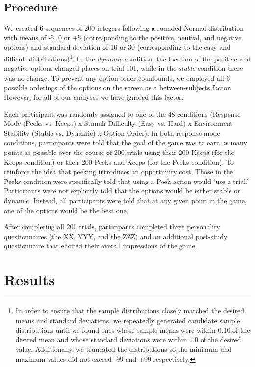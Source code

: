 \documentclass[a4paper,doc,natbib,floatsintext]{apa6}
\begin{document}
\subsection{Procedure}

We created 6 sequences of 200 integers following a rounded Normal distribution with means of -5, 0 or +5 (corresponding to the positive, neutral, and negative options) and standard deviation of 10 or 30 (corresponding to the easy and difficult distributions)\footnote{In order to ensure that the sample distributions closely matched the desired means and standard deviations, we repeatedly generated candidate sample distributions until we found ones whose sample means were within 0.10 of the desired mean and whose standard deviations were within 1.0 of the desired value. Additionally, we truncated the distributions so the minimum and maximum values did not exceed -99 and +99 respectively.}. In the \textit{dynamic} condition, the location of the positive and negative options changed places on trial 101, while in the \textit{stable} condition there was no change. To prevent any option order counfounds, we employed all 6 possible orderings of the options on the screen as a between-subjects factor. However, for all of our analyses we have ignored this factor.

Each participant was randomly assigned to one of the 48 conditions (Response Mode (Peeks vs. Keeps) x Stimuli Difficulty (Easy vs. Hard) x Environment Stability (Stable vs. Dynamic) x Option Order). In both response mode conditions, participants were told that the goal of the game was to earn as many points as possible over the course of 200 trials using their 200 Keeps (for the Keeps condition) or their 200 Peeks and Keeps (for the Peeks condition). To reinforce the idea that peeking introduces an opportunity cost, Those in the Peeks condition were specifically told that using a Peek action would `use a trial.' Participants were not explicitly told that the options would be either stable or dynamic. Instead, all participants were told that at any given point in the game, one of the options would be the best one.

After completing all 200 trials, participants completed three personality questionnaires (the XX, YYY, and the ZZZ) and an additional post-study questionnaire that elicited their overall impressions of the game.

\section{Results}
\end{document}
